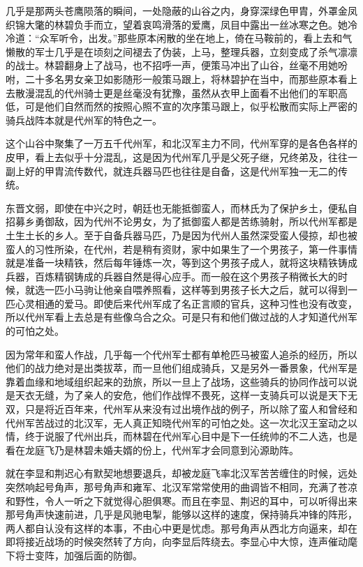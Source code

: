 几乎是那两头苍鹰陨落的瞬间，一处隐蔽的山谷之内，身穿深绿色甲胄，外罩金凤织锦大氅的林碧负手而立，望着哀鸣滑落的爱鹰，凤目中露出一丝冰寒之色。她冷冷道：“众军听令，出发。”那些原本闲散的坐在地上，倚在马鞍前的，看上去和气懒散的军士几乎是在顷刻之间褪去了伪装，上马，整理兵器，立刻变成了杀气凛凛的战士。林碧翻身上了战马，也不招呼一声，便策马冲出了山谷，丝毫不用她吩咐，二十多名男女亲卫如影随形一般策马跟上，将林碧护在当中，而那些原本看上去散漫混乱的代州骑士更是丝毫没有犹豫，虽然从衣甲上面看不出他们的军职高低，可是他们自然而然的按照心照不宣的次序策马跟上，似乎松散而实际上严密的骑兵战阵本就是代州军的特色之一。

这个山谷中聚集了一万五千代州军，和北汉军主力不同，代州军穿的是各色各样的皮甲，看上去似乎十分混乱，这是因为代州军几乎是父死子继，兄终弟及，往往一副上好的甲胄流传数代，就连兵器马匹也往往是自备，这是代州军独一无二的传统。

东晋文弱，即使在中兴之时，朝廷也无能抵御蛮人，而林氏为了保护乡土，便私自招募乡勇御敌，因为代州不论男女，为了抵御蛮人都是苦练骑射，所以代州军都是土生土长的乡人。至于自备兵器马匹，乃是因为代州人虽然深受蛮人侵掠，却也被蛮人的习性所染，在代州，若是稍有资财，家中如果生了一个男孩子，第一件事情就是准备一块精铁，然后每年锤炼一次，等到这个男孩子成人，就将这块精铁铸成兵器，百炼精钢铸成的兵器自然是得心应手。而一般在这个男孩子稍微长大的时候，就选一匹小马驹让他亲自喂养照看，这样等到男孩子长大之后，就可以得到一匹心灵相通的爱马。即使后来代州军成了名正言顺的官兵，这种习性也没有改变，所以代州军看上去总是有些像乌合之众。可是只有和他们做过战的人才知道代州军的可怕之处。

因为常年和蛮人作战，几乎每一个代州军士都有单枪匹马被蛮人追杀的经历，所以他们的战力绝对是出类拔萃，而一旦他们组成骑兵，又是另外一番景象，代州军是靠着血缘和地域组织起来的劲旅，所以一旦上了战场，这些骑兵的协同作战可以说是天衣无缝，为了亲人的安危，他们作战悍不畏死，这样一支骑兵可以说是天下无双，只是将近百年来，代州军从来没有过出境作战的例子，所以除了蛮人和曾经和代州军苦战过的北汉军，无人真正知晓代州军的可怕之处。这一次北汉王室动之以情，终于说服了代州出兵，而林碧在代州军心目中是下一任统帅的不二人选，也是看在龙庭飞乃是林碧未婚夫婿的份上，代州军才会同意到沁源助阵。

就在李显和荆迟心有默契地想要退兵，却被龙庭飞率北汉军苦苦缠住的时候，远处突然响起号角声，那号角声和雍军、北汉军常常使用的曲调皆不相同，充满了苍凉和野性，令人一听之下就觉得心胆俱寒。而且在李显、荆迟的耳中，可以听得出来那号角声快速前进，几乎是风驰电掣，能够以这样的速度，保持骑兵冲锋的阵形，两人都自认没有这样的本事，不由心中更是忧虑。那号角声从西北方向逼来，却在即将接近战场的时候突然转了方向，向李显后阵绕去。李显心中大惊，连声催动麾下将士变阵，加强后面的防御。

